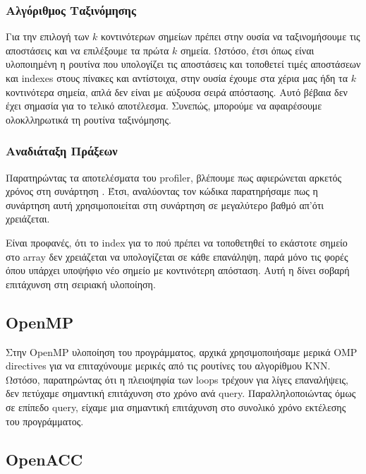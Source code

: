 \documentclass[11pt]{scrartcl} %
\begin{document}
\subsubsection{Αλγόριθμος Ταξινόμησης}

Για την επιλογή των $k$ κοντινότερων σημείων πρέπει στην ουσία να
ταξινομήσουμε τις αποστάσεις και να επιλέξουμε τα πρώτα $k$ σημεία.
Ωστόσο, έτσι όπως είναι υλοποιημένη η ρουτίνα που υπολογίζει τις αποστάσεις και
τοποθετεί τιμές αποστάσεων και indexes στους πίνακες  και  αντίστοιχα, 
στην ουσία έχουμε στα χέρια μας ήδη τα $k$ κοντινότερα σημεία, απλά δεν είναι με αύξουσα σειρά απόστασης.
Αυτό βέβαια δεν έχει σημασία για το τελικό αποτέλεσμα.
Συνεπώς, μπορούμε να αφαιρέσουμε ολοκλληρωτικά τη ρουτίνα ταξινόμησης.

\subsubsection{Αναδιάταξη Πράξεων}

Παρατηρώντας τα αποτελέσματα του profiler, βλέπουμε πως αφιερώνεται αρκετός χρόνος στη συνάρτηση .
Έτσι, αναλύοντας τον κώδικα παρατηρήσαμε πως η συνάρτηση αυτή χρησιμοποιείται στη συνάρτηση  σε μεγαλύτερο 
βαθμό απ'ότι χρειάζεται.



Είναι προφανές, ότι το index για το πού πρέπει να τοποθετηθεί το εκάστοτε σημείο στο array δεν χρειάζεται να υπολογίζεται σε 
κάθε επανάληψη, παρά μόνο τις φορές όπου υπάρχει υποψήφιο νέο σημείο με κοντινότερη απόσταση.
Αυτή η  δίνει σοβαρή επιτάχυνση στη σειριακή υλοποίηση.

\subsection{OpenMP}

Στην OpenMP υλοποίηση του προγράμματος, αρχικά χρησιμοποιήσαμε μερικά OMP directives
για να επιταχύνουμε μερικές από τις ρουτίνες του αλγορίθμου ΚΝΝ.
Ωστόσο, παρατηρώντας ότι η πλειοψηφία των loops τρέχουν για λίγες επαναλήψεις, δεν πετύχαμε σημαντική επιτάχυνση στο χρόνο ανά query.
Παραλληλοποιώντας όμως σε επίπεδο query, είχαμε μια σημαντική επιτάχυνση στο συνολικό χρόνο εκτέλεσης του προγράμματος.



\subsection{OpenACC}
\end{document}

